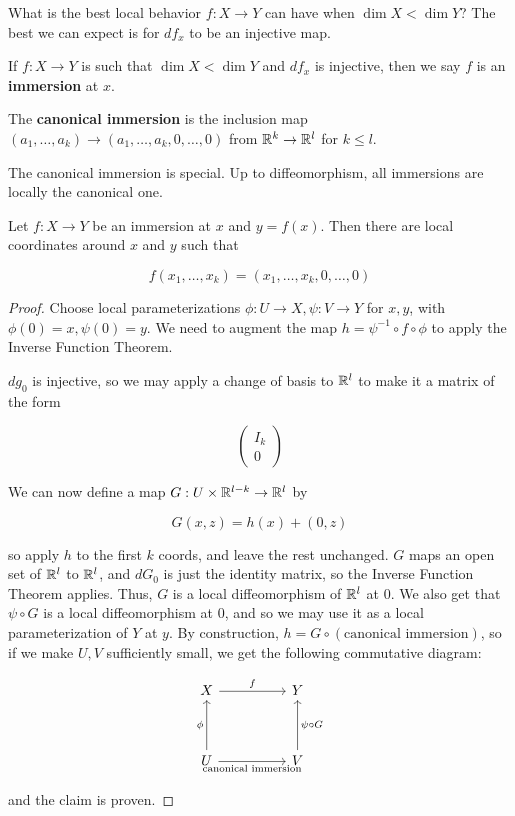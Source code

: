 What is the best local behavior $f: X \to Y$ can have when $\dim X < \dim Y$? The best we can expect is for $df_x$ to be an injective map. 

\begin{definition}
    If $f: X \to Y$ is such that $\dim X < \dim Y$ and $df_x$ is injective, then we say $f$ is an \textbf{immersion} at $x$. 

    The \textbf{canonical immersion} is the inclusion map $(a_1, \ldots, a_k) \to (a_1, \ldots, a_k, 0, \ldots, 0)$ from $\mathbb{R}^k \to \mathbb{R}^{l}$ for $k \leq l$. 
\end{definition}

The canonical immersion is special. Up to diffeomorphism, all immersions are locally the canonical one.

\begin{theorem}
    Let $f: X \to Y$ be an immersion at $x$ and $y = f(x)$. Then there are local coordinates around $x$ and $y$ such that 

    \[f(x_1, \ldots, x_k) = (x_1, \ldots, x_k, 0, \ldots, 0)\]
\end{theorem}

\begin{proof}
    Choose local parameterizations $\phi: U \to X, \psi: V \to Y$ for $x,y$, with $\phi(0) = x, \psi(0) = y$. We need to augment the map $h = \psi^{-1} \circ f \circ \phi$ to apply the Inverse Function Theorem. 

    $dg_0$ is injective, so we may apply a change of basis to $\mathbb{R}^l$ to make it a matrix of the form

    \[\begin{pmatrix}
        I_k \\
        \hline 0
    \end{pmatrix}\]

    We can now define a map $G: U \times \mathbb{R}^{l-k} \to \mathbb{R}^l$ by 

    \[G(x,z) = h(x) + (0,z)\]

    so apply $h$ to the first $k$ coords, and leave the rest unchanged. $G$ maps an open set of $\mathbb{R}^l$ to $\mathbb{R}^l$, and $dG_0$ is just the identity matrix, so the Inverse Function Theorem applies. Thus, $G$ is a local diffeomorphism of $\mathbb{R}^l$ at 0. We also get that $\psi \circ G$ is a local diffeomorphism at 0, and so we may use it as a local parameterization of $Y$ at $y$. By construction, $h = G \circ (\text{canonical immersion})$, so if we make $U,V$ sufficiently small, we get the following commutative diagram:

    \[\begin{tikzcd}
        X && Y \\
        \\
        U && V
        \arrow["f", from=1-1, to=1-3]
        \arrow["\phi", from=3-1, to=1-1]
        \arrow["{\text{canonical immersion}}"', from=3-1, to=3-3]
        \arrow["{\psi \circ G}"', from=3-3, to=1-3]
    \end{tikzcd}\]

    and the claim is proven. 
\end{proof}

